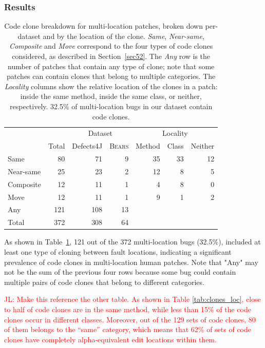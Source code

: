 \documentclass[10pt, conference]{IEEEtran}
\newcommand\todo[1]{\textcolor{red}{#1}}
\newcommand\bears{\textsc{Bears}\xspace}
\begin{document}
\subsubsection{Results}

\begin{table}
{\begin{center}
\begin{tabular} {lrrrrrr}
\toprule
&&\multicolumn{2}{c}{Dataset} &\multicolumn{3}{c}{Locality}\\
& Total & Defects4J & \bears & Method & Class & Neither\\
\midrule
Same      &  80 &  71 & 9 & 35 & 33 & 12 \\
Near-same   &  25 &  23 & 2 & 12 &  8 &  5 \\
Composite &  12 &  11 & 1 &  4 &  8 &  0 \\
Move      &  12 &  11 & 1 &  9 &  1 &  2 \\
\midrule
Any       & 121 & 108 & 13\\
Total     & 372 & 308 & 64\\
\bottomrule
\end{tabular}
\end{center}
}
\caption{Code clone breakdown for multi-location patches, broken down
  per-dataset and by the location of the clone. \emph{Same}, \emph{Near-same},
  \emph{Composite} and \emph{Move} correspond to the four types of code clones
  considered, as described in Section~\ref{sec52}.  The \emph{Any} row is the
  number of patches that contain any type of clone; note that some patches can
  contain clones that belong to multiple categories. The \emph{Locality} columns
  show the relative location of the clones in a patch: inside the same method,
  inside the same class, or neither, respectively. 32.5\% of multi-location bugs
  in our dataset contain code clones.}
\label{tab:clones}
\end{table}

As shown in Table~\ref{tab:clones}, 121 out of the 372 multi-location bugs
(32.5\%), included at least one type of cloning between fault locations,
indicating a significant prevalence of code clones in multi-location human
patches.  Note that "Any" may not be the sum of the previous four rows because
some bug could contain multiple pairs of code clones that belong to different
categories.

\todo{JL: Make this reference the other table. As shown in Table \ref{tab:clones_loc}, close to half of code clones are in the same method, while less than
15\% of the code clones occur in different classes. Moreover, out of the 129 sets of code clones,
80 of them belongs to the ``same'' category, which means that 62\% of sets of code clones have completely
alpha-equivalent edit locations within them.}
\end{document}
